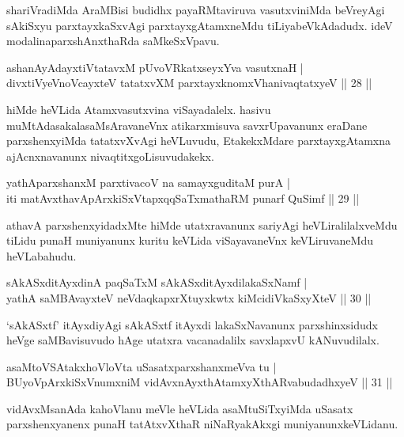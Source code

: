 \begin{artha}
shariVradiMda AraMBisi budidhx payaRMtaviruva vasutxviniMda beVreyAgi sAkiSxyu parxtayxkaSxvAgi parxtayxgAtamxneMdu tiLiyabeVkAdadudx. ideV modalina\break parxshAnxthaRda saMkeSxVpavu.
\end{artha}

\begin{shl}
ashanAyAdayxtiVtatavxM pUvoVRkatxseyxYva vasutxnaH |\\
divxtiVyeVnoVcayxteV tatatxvXM parxtayxknomxVhanivaqtatxyeV \hfill || 28 ||
\end{shl}

\begin{artha}
hiMde heVLida Atamxvasutxvina viSayadalelx. hasivu muMtAda\break sakalasaMsAravaneVnx atikarxmisuva savxrUpavanunx eraDane parxshenxyiMda tatatxvXvAgi heVLuvudu, EtakekxMdare parxtayxgAtamxna ajAcnxnavanunx nivaqtitxgoLisuvudakekx.
\end{artha}

\begin{shl}
yathAparxshanxM parxtivacoV na samayxguditaM purA |\\
iti matAvx\s thavA\s pArxkiSxVtapxqqSaTxmathaRM punarf QuSimf \hfill || 29 ||
\end{shl}

\begin{artha}
athavA parxshenxyidadxMte hiMde utatxravanunx sariyAgi heVLiralilalxveMdu tiLidu punaH muniyanunx kuritu keVLida viSayavaneVnx keVLiruvaneMdu heVLabahudu.
\end{artha}

\begin{shl}
sAkASxditAyxdinA paqSaTxM sAkASxditAyxdilakaSxNamf |\\
yathA saMBAvayxteV neVdaqkapxrXtuyxkwtx kiMcidiVkaSxyXteV \hfill || 30 ||
\end{shl}

\begin{artha}%
`sAkASxtf' itAyxdiyAgi sAkASxtf itAyxdi lakaSxNavanunx parxshinxsidudx heVge saMBavisuvudo hAge utatxra vacanadalilx  savxlapxvU kANuvudilalx.
\end{artha}

\begin{shl}
asaMtoVSAtakxhoVloV\s ta uSasatxparxshanxmeVva tu |\\
BUyoV\s pArxkiSxVnumxniM vidAvxnAyxthAtamxyXthARvabudadhxyeV \hfill || 31 ||
\end{shl}

\begin{artha}
vidAvxMsanAda kahoVlanu meVle heVLida asaMtuSiTxyiMda uSasatx parxshenxyanenx punaH tatAtxvXthaR niNaRyakAkxgi muniyanunx\break keVLidanu.
\end{artha}

